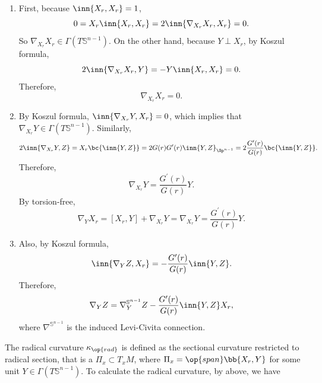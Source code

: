 \begin{enumerate}[label=(\arabic{*})]
    \item First, because $\inn{X_r,X_r} = 1$,
    \begin{equation*}
        0 = X_r\inn{X_r,X_r} = 2\inn{\nabla_{X_r}X_r,X_r} = 0.
    \end{equation*}
    So $\nabla_{X_r}X_r \in \Gamma(T\mathbb{S}^{n-1})$. On the other hand, because $Y \perp X_r$, by Koszul formula,
    \begin{equation*}
        2\inn{\nabla_{X_r}X_r,Y} = - Y\inn{X_r,X_r} = 0.
    \end{equation*}
    Therefore,
    \begin{equation*}
        \nabla_{X_r}X_r = 0.
    \end{equation*}

    \item  By Koszul formula, $\inn{\nabla_{X_r}Y,X_r} = 0$, which implies that $\nabla_{X_r}Y \in \Gamma(T\mathbb{S}^{n-1})$. Similarly,
    \begin{equation*}
        2\inn{\nabla_{X_r}Y,Z} = X_r\bc{\inn{Y,Z}} = 2G(r)G^\prime(r)\inn{Y,Z}_{\Sp^{n-1}} = 2\frac{G^\prime(r)}{G(r)}\bc{\inn{Y,Z}}.
    \end{equation*}
    Therefore,
    \begin{equation*}
        \nabla_{X_r}Y = \frac{G^\prime(r)}{G(r)}Y.
    \end{equation*}
    By torsion-free,
    \begin{equation*}
        \nabla_{Y}X_r = [X_r,Y]+\nabla_{X_r}Y = \nabla_{X_r}Y = \frac{G^\prime(r)}{G(r)}Y.
    \end{equation*}

    \item Also, by Koszul formula,
    \begin{equation*}
        \inn{\nabla_{Y}Z,X_r} = -\frac{G^\prime(r)}{G(r)}\inn{Y,Z}.
    \end{equation*}
    Therefore,
    \begin{equation*}
        \nabla_{Y}Z = \nabla^{\mathbb{S}^{n-1}}_{Y}Z - \frac{G^\prime(r)}{G(r)}\inn{Y,Z}X_r,
    \end{equation*}
    where $\nabla^{\mathbb{S}^{n-1}}$ is the induced Levi-Civita connection.
\end{enumerate}
The radical curvature $\kappa_{\op{rad}}$ is defined as the sectional curvature restricted to radical section, that is a $\Pi_x \subset T_xM$, where $\Pi_x = \op{span}\bb{X_r,Y}$ for some unit $Y \in \Gamma(T\mathbb{S}^{n-1})$. To calculate the radical curvature, by above, we have
